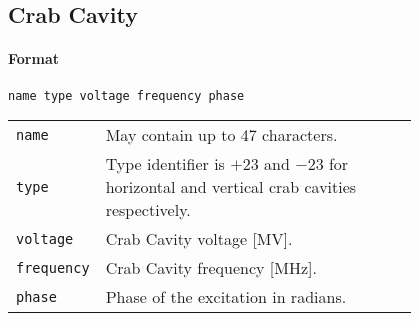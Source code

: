 



\subsection{Crab Cavity} \label{CrabCav}

\paragraph{Format} \texttt{name type voltage frequency phase}

\bigskip
\begin{tabular}{@{}lp{0.8\linewidth}}
    \texttt{name} & May contain up to 47 characters. \\
    \texttt{type} & Type identifier is $+23$ and $-23$ for horizontal and vertical crab cavities respectively. \\
    \texttt{voltage} & Crab Cavity voltage [MV]. \\
    \texttt{frequency} & Crab Cavity frequency [MHz]. \\
    \texttt{phase} & Phase of the excitation in radians.
\end{tabular}


